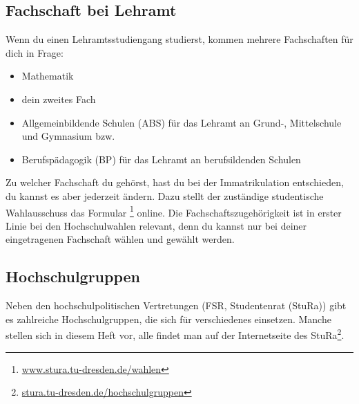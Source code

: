 \documentclass{scrartcl}
\begin{document}
\subsection{Fachschaft bei Lehramt}
\label{sub:fachschaft_bei_lehramt}
Wenn du einen Lehramtsstudiengang studierst, kommen mehrere Fachschaften für dich in Frage:
\begin{itemize}
  \item Mathematik
  \item dein zweites Fach
  \item Allgemeinbildende Schulen (ABS) für das Lehramt an Grund-, Mittelschule und Gymnasium bzw.
  \item Berufspädagogik (BP) für das Lehramt an berufsildenden Schulen 
\end{itemize}
Zu welcher Fachschaft du gehörst, hast du bei der Immatrikulation entschieden,
du kannst es aber jederzeit ändern.
Dazu stellt der zuständige studentische Wahlausschuss das Formular
\footnote{\url{www.stura.tu-dresden.de/wahlen}} online.
  Die Fachschaftszugehörigkeit ist in erster Linie bei den Hochschulwahlen relevant,
  denn du kannst nur bei deiner eingetragenen Fachschaft wählen und gewählt werden.

\subsection{Hochschulgruppen}
\label{sub:hochschulgruppen}
Neben den hochschulpolitischen Vertretungen (FSR, Studentenrat (StuRa)) gibt es zahlreiche Hochschulgruppen,
die sich für verschiedenes einsetzen. Manche stellen sich in diesem Heft vor, alle findet man auf der Internetseite des StuRa\footnote{\url{stura.tu-dresden.de/hochschulgruppen}}.
\end{document}
